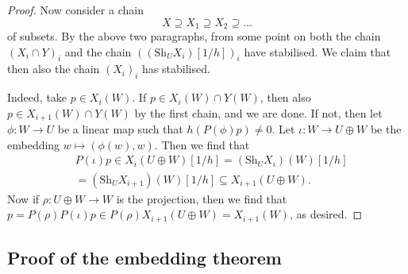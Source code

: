 \documentclass{amsart}
\newcommand{\Sh}{\mathrm{Sh}}
\begin{document}
\begin{proof}
Now consider a chain 
\[ X \supseteq X_1 \supseteq X_2 \supseteq \ldots \]
of subsets. By the above two paragraphs, from some point on
both the chain $(X_i \cap Y)_i$ and the chain $((\Sh_U
X_i)[1/h])_i$ have stabilised. We claim that then also the chain
$(X_i)_i$ has stabilised. 

Indeed, take $p \in X_i(W)$. If $p \in X_i(W) \cap Y(W)$, then also $p \in
X_{i+1}(W) \cap Y(W)$ by the first chain, and we are done. If not, then
let $\phi:W \to U$ be a linear map such that $h(P(\phi)p) \neq
0$. Let $\iota:W \to U \oplus W$ be the embedding $w \mapsto
(\phi(w),w)$. Then we find that 
\begin{align*} &P(\iota)p \in X_i(U \oplus W)[1/h]
=(\Sh_U X_i)(W)[1/h]\\
&=(\Sh_U X_{i+1})(W)[1/h]
\subseteq X_{i+1}(U \oplus W). 
\end{align*}
Now if $\rho:U \oplus W \to W$ is the projection, then we
find that $p=P(\rho)P(\iota)p \in P(\rho)X_{i+1}(U \oplus
W)=X_{i+1}(W)$, as desired. 
\end{proof}

\subsection{Proof of the embedding theorem}
\end{document}
